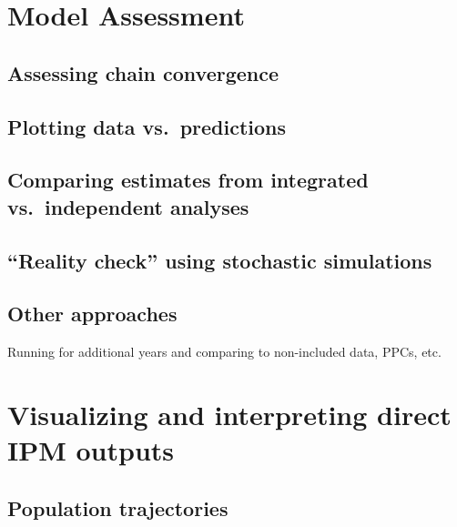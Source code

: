 \documentclass[
]{book}
\begin{document}
\hypertarget{ModelAssm}{%
\chapter{Model Assessment}\label{ModelAssm}}

\hypertarget{assessing-chain-convergence}{%
\section{Assessing chain convergence}\label{assessing-chain-convergence}}

\hypertarget{plotting-data-vs.-predictions}{%
\section{Plotting data vs.~predictions}\label{plotting-data-vs.-predictions}}

\hypertarget{comparing-estimates-from-integrated-vs.-independent-analyses}{%
\section{Comparing estimates from integrated vs.~independent analyses}\label{comparing-estimates-from-integrated-vs.-independent-analyses}}

\hypertarget{reality-check-using-stochastic-simulations}{%
\section{``Reality check'' using stochastic simulations}\label{reality-check-using-stochastic-simulations}}

\hypertarget{other-approaches}{%
\section{Other approaches}\label{other-approaches}}

Running for additional years and comparing to non-included data, PPCs, etc.

\hypertarget{ResultsViz}{%
\chapter{Visualizing and interpreting direct IPM outputs}\label{ResultsViz}}

\hypertarget{population-trajectories}{%
\section{Population trajectories}\label{population-trajectories}}
\end{document}
